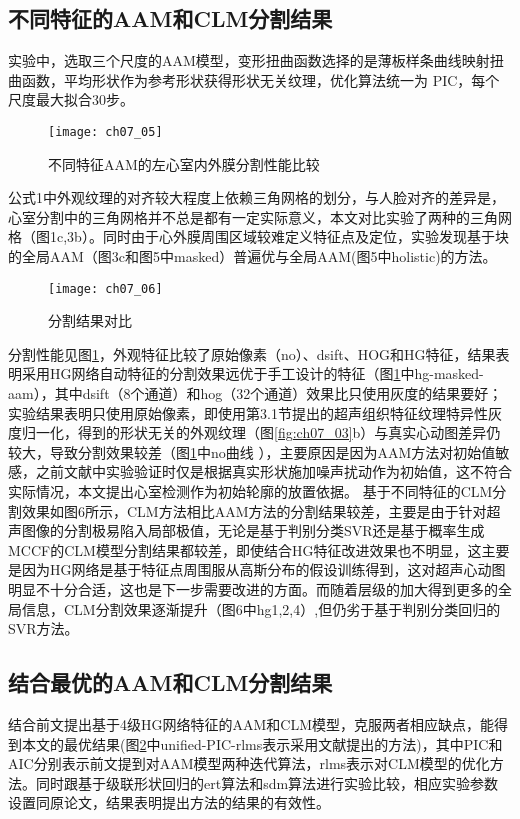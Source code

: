 \subsection{不同特征的AAM和CLM分割结果}
实验中，选取三个尺度的AAM模型，变形扭曲函数选择的是薄板样条曲线映射扭曲函数，平均形状作为参考形状获得形状无关纹理，优化算法统一为 PIC，每个尺度最大拟合30步。
\begin{figure}[!htbp]
\centering
\texttt{[image: ch07\_05]}
\caption{不同特征AAM的左心室内外膜分割性能比较}
\label{fig:ch07_05}
\end{figure}  

公式1中外观纹理的对齐较大程度上依赖三角网格的划分，与人脸对齐的差异是，心室分割中的三角网格并不总是都有一定实际意义，本文对比实验了两种的三角网格（图1c,3b）。同时由于心外膜周围区域较难定义特征点及定位，实验发现基于块的全局AAM（图3c和图5中masked）普遍优与全局AAM(图5中holistic)的方法。
\begin{figure}[!htbp]
\centering
\texttt{[image: ch07\_06]}
\caption{分割结果对比}
\label{fig:ch07_06}
\end{figure}  
 
 
分割性能见图\ref{fig:ch07_05}，外观特征比较了原始像素（no）、dsift\citep{Lowe2004}、HOG和HG特征，结果表明采用HG网络自动特征的分割效果远优于手工设计的特征（图\ref{fig:ch07_05}中hg-masked-aam），其中dsift（8个通道）和hog（32个通道）效果比只使用灰度的结果要好；实验结果表明只使用原始像素，即使用第3.1节提出的超声组织特征纹理特异性灰度归一化，得到的形状无关的外观纹理（图\ref{fig:ch07_03}b）与真实心动图差异仍较大，导致分割效果较差（图\ref{fig:ch07_05}中no曲线 ），主要原因是因为AAM方法对初始值敏感，之前文献\citep{Bosch2002,Hansson2014}中实验验证时仅是根据真实形状施加噪声扰动作为初始值\citep{jixianghu-2016}，这不符合实际情况，本文提出心室检测作为初始轮廓的放置依据。
基于不同特征的CLM分割效果如图6所示，CLM方法相比AAM方法的分割结果较差，主要是由于针对超声图像的分割极易陷入局部极值，无论是基于判别分类SVR还是基于概率生成MCCF的CLM模型分割结果都较差，即使结合HG特征改进效果也不明显，这主要是因为HG网络是基于特征点周围服从高斯分布的假设训练得到，这对超声心动图明显不十分合适，这也是下一步需要改进的方面。而随着层级的加大得到更多的全局信息，CLM分割效果逐渐提升（图6中hg1,2,4）,但仍劣于基于判别分类回归的SVR方法。
\subsection{结合最优的AAM和CLM分割结果}
结合前文提出基于4级HG网络特征的AAM和CLM模型，克服两者相应缺点，能得到本文的最优结果(图\ref{fig:ch07_06}中unified-PIC-rlms表示采用文献\citep{Jan2017}提出的方法)，其中PIC和AIC分别表示前文提到对AAM模型两种迭代算法，rlms表示对CLM模型的优化方法。同时跟基于级联形状回归的ert算法\citep{Kazemi2014a}和sdm算法\citep{Xiong2013}进行实验比较，相应实验参数设置同原论文，结果表明提出方法的结果的有效性。


